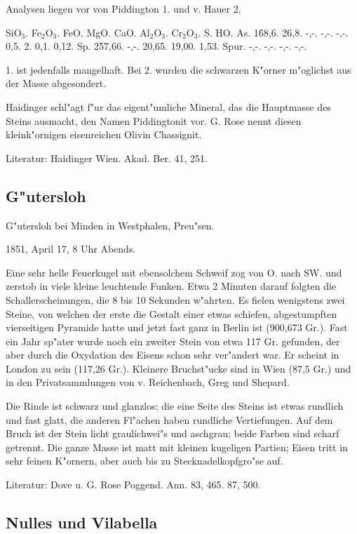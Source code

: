 \documentclass[a4paper, 11pt, oneside]{article}
\begin{document}
Analysen liegen vor von Piddington 1. und v. Hauer 2.

SiO$_{3}$. Fe$_{2}$O$_{3}$. FeO. MgO. CaO. Al$_{2}$O$_{3}$. Cr$_{2}$O$_{3}$. S. HO. As.  
1\. 68,6. 26,8. -,-. -,-. -,-. 0,5. 2. 0,1. 0,12. Sp.  
2\. 57,66. -,-. 20,65. 19,00. 1,53. Spur. -,-. -,-. -,-. -,-.

1. ist jedenfalls mangelhaft. Bei 2. wurden die schwarzen K"orner m"oglichst aus der Masse abgesondert.

Haidinger schl"agt f"ur das eigent"umliche Mineral, das die Hauptmasse des Steins ausmacht, den Namen Piddingtonit vor. G. Rose nennt diesen kleink"ornigen eisenreichen Olivin Chassignit.

Literatur: Haidinger Wien. Akad. Ber. 41, 251.

\subsection{G"utersloh}

G"utersloh bei Minden in Westphalen, Preu"sen.

1851, April 17, 8 Uhr Abends.

Eine sehr helle Feuerkugel mit ebensolchem Schweif zog von O. nach SW. und zerstob in viele kleine leuchtende Funken. Etwa 2 Minuten darauf folgten die Schallerscheinungen, die 8 bis 10 Sekunden w"ahrten. Es fielen wenigstens zwei Steine, von welchen der erste die Gestalt einer etwas schiefen, abgestumpften vierseitigen Pyramide hatte und jetzt fast ganz in Berlin ist (900,673 Gr.). Fast ein Jahr sp"ater wurde noch ein zweiter Stein von etwa 117 Gr. gefunden, der aber durch die Oxydation des Eisens schon sehr ver"andert war. Er scheint in London zu sein (117,26 Gr.). Kleinere Bruchst"ucke sind in Wien (87,5 Gr.) und in den Privatsammlungen von v. Reichenbach, Greg und Shepard.

Die Rinde ist schwarz und glanzlos; die eine Seite des Steins ist etwas rundlich und fast glatt, die anderen Fl"achen haben rundliche Vertiefungen. Auf dem Bruch ist der Stein licht graulichwei"s und aschgrau; beide Farben sind scharf getrennt. Die ganze Masse ist matt mit kleinen kugeligen Partien; Eisen tritt in sehr feinen K"ornern, aber auch bis zu Stecknadelkopfgro"se auf.

Literatur: Dove u. G. Rose Poggend. Ann. 83, 465. 87, 500.

\subsection{Nulles und Vilabella}
\end{document}
